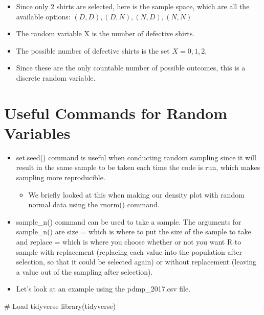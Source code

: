 \documentclass[
  letterpaper,
  DIV=11,
  numbers=noendperiod]{scrreprt}
\newenvironment{Shaded}{\begin{snugshade}}{\end{snugshade}}
\newcommand{\CommentTok}[1]{\textcolor[rgb]{0.37,0.37,0.37}{#1}}
\newcommand{\FunctionTok}[1]{\textcolor[rgb]{0.28,0.35,0.67}{#1}}
\newcommand{\NormalTok}[1]{\textcolor[rgb]{0.00,0.23,0.31}{#1}}
\providecommand{\tightlist}{%
  \setlength{\itemsep}{0pt}\setlength{\parskip}{0pt}}\usepackage{longtable,booktabs,array}
\begin{document}
\begin{itemize}
  \begin{itemize}
  \tightlist
  \item
    Since only 2 shirts are selected, here is the sample space, which
    are all the available options: \({(D,D), (D,N), (N,D), (N,N)}\)
  \item
    The random variable X is the number of defective shirts.
  \item
    The possible number of defective shirts is the set \(X={0,1,2}\),
  \item
    Since these are the only countable number of possible outcomes, this
    is a discrete random variable.
  \end{itemize}
\end{itemize}

\section{Useful Commands for Random
Variables}\label{useful-commands-for-random-variables}

\begin{itemize}
\tightlist
\item
  set.seed() command is useful when conducting random sampling since it
  will result in the same sample to be taken each time the code is run,
  which makes sampling more reproducible.

  \begin{itemize}
  \tightlist
  \item
    We briefly looked at this when making our density plot with random
    normal data using the rnorm() command.
  \end{itemize}
\item
  sample\_n() command can be used to take a sample. The arguments for
  sample\_n() are size = which is where to put the size of the sample to
  take and replace = which is where you choose whether or not you want R
  to sample with replacement (replacing each value into the population
  after selection, so that it could be selected again) or without
  replacement (leaving a value out of the sampling after selection).
\item
  Let's look at an example using the pdmp\_2017.csv file.
\end{itemize}

\begin{Shaded}
\begin{Highlighting}[]
\CommentTok{\# Load tidyverse}
\FunctionTok{library}\NormalTok{(tidyverse)}
\end{Highlighting}
\end{Shaded}
\end{document}
